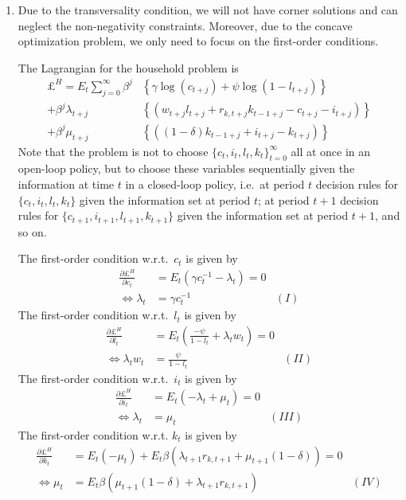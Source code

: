 \begin{enumerate}

\item Due to the transversality condition,
  we will not have corner solutions and can neglect the non-negativity constraints.
Moreover, due to the concave optimization problem, we only need to focus on the first-order conditions.

The Lagrangian for the household problem is
\begin{align*}
\pounds^H = E_t\sum_{j=0}^{\infty}\beta^j&\left \{ \gamma \log(c_{t+j}) + \psi \log(1-l_{t+j}) \right \}
\\
+\beta^j \lambda_{t+j} &\left \{ \left(w_{t+j} l_{t+j} + r_{k,t+j} k_{t-1+j} - c_{t+j} - i_{t+j}\right) \right \}
\\
+\beta^j \mu_{t+j} &\left \{ \left((1-\delta)k_{t-1+j} + i_{t+j} - k_{t+j}\right) \right \}
\end{align*}
Note that the problem is not to choose \( {\{c_t,i_t,l_t,k_{t} \}}_{t=0}^\infty \) all at once in an open-loop policy,
  but to choose these variables sequentially given the information at time \(t\) in a closed-loop policy,
  i.e.\ at period \(t\) decision rules for \({\{c_t,i_t,l_t,k_{t}\}}\) given the information set at period \(t\);
  at period \(t+1\) decision rules for \({\{c_{t+1},i_{t+1},l_{t+1},k_{t+1}\}}\) given the information set at period \(t+1\),
  and so on.
		
The first-order condition w.r.t.\
\(c_t\) is given by
\begin{align*}
\frac{\partial \pounds^H}{\partial c_{t}} &= E_t \left(\gamma c_t^{-1}-\lambda_{t}\right) = 0
\\
\Leftrightarrow \lambda_{t} &= \gamma c_{t}^{-1} & (I)
\end{align*}
The first-order condition w.r.t.\
\(l_t\) is given by
\begin{align*}
\frac{\partial \pounds^H}{\partial l_{t}} &= E_t \left(\frac{-\psi}{1-l_{t}} + \lambda_{t} w_{t}\right) = 0
\\
\Leftrightarrow \lambda_{t} w_{t} &= \frac{\psi}{1-l_{t}} &(II)
\end{align*}
The first-order condition w.r.t.\
\(i_{t}\) is given by
\begin{align*}
\frac{\partial \pounds^H}{\partial i_{t}} &= E_t \left(-\lambda_{t} + \mu_{t}\right) = 0
\\
\Leftrightarrow \lambda_{t} &= \mu_{t} & (III)
\end{align*}
The first-order condition w.r.t.
\(k_{t}\) is given by
\begin{align*}
\frac{\partial \pounds^H}{\partial k_{t}} &= E_t (-\mu_{t}) + 
	E_t \beta \left(\lambda_{t+1} r_{k,t+1} + \mu_{t+1}(1-\delta)\right) = 0
\\
\Leftrightarrow \mu_{t} &= E_t \beta(\mu_{t+1}(1-\delta) + \lambda_{t+1} r_{k,t+1}) & (IV)
\end{align*}


\end{enumerate}
